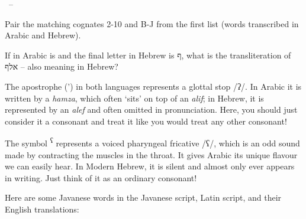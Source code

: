 \begin{refsection}
\begin{problem}{\langnameArabic\ -- \langnameHebrew}{\nameGParti}{}
\begin{assgts}
    \item Pair the matching cognates 2-10 and B-J from the first list (words transcribed in Arabic and Hebrew).
    \item If  in Arabic is  and the final letter  in Hebrew is \mbox{ף}, what is the transliteration of {{אלף}} – also meaning  in Hebrew?
\end{assgts}

\begin{tblsWarning}
The apostrophe (') in both languages represents a glottal stop /ʔ/. In Arabic it is written by a \textit{hamza}, which often `sits' on top of an \textit{alif}; in Hebrew, it is represented by an \textit{alef} and often omitted in pronunciation. Here, you should just consider it a consonant and treat it like you would treat any other consonant!

The symbol \textsuperscript{ʕ} represents a voiced pharyngeal fricative /ʕ/, which is an odd sound made by contracting the muscles in the throat. It gives Arabic its unique flavour we can easily hear. In Modern Hebrew, it is silent and almost only ever appears in writing. Just think of it as an ordinary consonant!
\end{tblsWarning}

\end{problem}

\begin{problem}{\langnameJavanese}{\nameTHLee}{}
Here are some Javanese words in the Javanese script, Latin script, and their English translations:


\end{problem}
\end{refsection}
